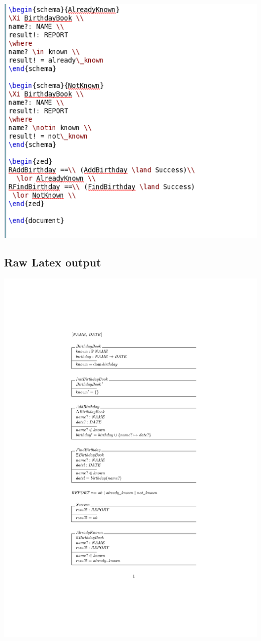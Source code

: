 \noindent \includegraphics[scale=0.5]{examples/bb/0imageb.png}
%
\subsection{Raw Latex output}
\label{app:bb0o}

\noindent \includegraphics[clip, trim=4cm 5.5cm 4cm 4.2cm]{examples/bb/0comp.pdf}


